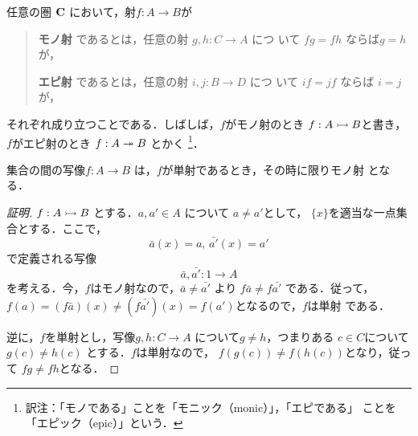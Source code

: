 \begin{definition}
 任意の圏 ${\bf C}$ において，射$f: A \to B$が

 \begin{quotation}
  {\bfseries モノ射}
  であるとは，任意の射 $g, h: C \to A$ につ
  いて $fg = fh$ ならば$g = h$が，
  \begin{center}
  \end{center}

  {\bfseries エピ射}
  であるとは，任意の射 $i, j: B \to D$ につ
  いて $if = jf$ ならば $i = j$が，
  \begin{center}
  \end{center}
 \end{quotation}
 それぞれ成り立つことである．しばしば，$f$がモノ射のとき
 $f: A \rightarrowtail B$と書き，$f$がエピ射のとき $f: A \twoheadrightarrow B$ とかく
 \footnote{訳注：「モノである」ことを「モニック（monic）」，「エピである」
 ことを「エピック（epic）」という．}．
\end{definition}
\begin{prop}
 集合の間の写像$f: A \to B$ は，$f$が単射であるとき，その時に限りモノ射
 となる．
\end{prop}

\begin{proof}[証明]
$f: A \rightarrowtail B$ とする．$a, a' \in A$ について $a \neq a'$として，
 $\{x\}$を適当な一点集合とする．ここで，
 \[
  \bar a(x) = a,\, \bar{a'}(x) = a'
 \]
 で定義される写像
 \[
  \bar a, \bar{a'}: 1 \to A
 \]
 を考える．今，$f$はモノ射なので，$\bar a \neq \bar{a'}$ より
 $f\bar a \neq f\bar{a'}$ である．従って，
 $f(a) = (f\bar a)(x) \neq (f\bar{a'})(x) = f(a')$となるので，$f$は単射
 である．

 逆に，$f$を単射とし，写像$g, h:C \to A$ について$g \neq h$，つまりある
 $c \in C$について $g(c) \neq h(c)$ とする．$f$は単射なので，
 $f(g(c)) \neq f(h(c))$となり，従って $fg \neq fh$となる．
\end{proof}

